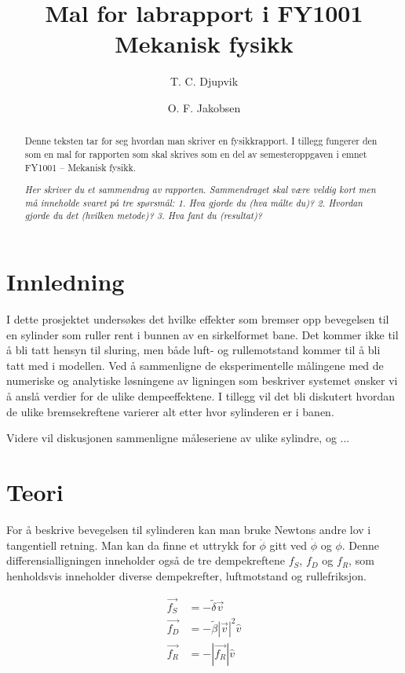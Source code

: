 \documentclass[5p]{elsarticle}
\title{Mal for labrapport i FY1001 Mekanisk fysikk}
\author[fysikk]{T. C. Djupvik}
\author[fysikk]{O. F. Jakobsen}
\begin{document}
\begin{abstract}
Denne teksten tar for seg hvordan man skriver en fysikkrapport. I tillegg fungerer
den som en mal for rapporten som skal skrives som en del av semesteroppgaven i emnet FY1001 – Mekanisk fysikk.

\textit{Her skriver du et sammendrag av rapporten. Sammendraget skal være veldig kort
men må inneholde svaret på tre spørsmål: 1. Hva gjorde du (hva målte du)? 2. Hvordan 
gjorde du det (hvilken metode)? 3. Hva fant du (resultat)?}
\end{abstract}

\maketitle %

\section{Innledning}
I dette prosjektet undersøkes det hvilke effekter som bremser opp bevegelsen 
til en sylinder som ruller rent i bunnen av en sirkelformet bane. Det kommer ikke til å 
bli tatt hensyn til sluring, men både luft- og rullemotstand kommer til å bli tatt med i modellen.
Ved å sammenligne de eksperimentelle målingene med de numeriske og analytiske løsningene av 
ligningen som beskriver systemet ønsker vi å anslå verdier for de ulike dempeeffektene. 
I tillegg vil det bli diskutert hvordan de ulike bremsekreftene varierer alt etter hvor sylinderen 
er i banen.
\par
Videre vil diskusjonen sammenligne måleseriene av ulike sylindre, og ...

\section{Teori}

For å beskrive bevegelsen til sylinderen kan man bruke Newtons andre lov i tangentiell retning.
Man kan da finne et uttrykk for \(\ddot{\phi}\) gitt ved \(\dot{\phi}\) og \(\phi\). 
Denne differensialligningen inneholder også de tre dempekreftene \(f_S\), \(f_D\) og \(f_R\), 
som henholdsvis inneholder diverse dempekrefter, luftmotstand og rullefriksjon.

\begin{align}
	\vec{f_S} & = -\tilde{\delta} \vec{v} 			\\
	\vec{f_D} & = -\tilde{\beta}|\vec{v}|^2\hat{v}  \\
	\vec{f_R} & = -|\vec{f_R}|\hat{v}				
\end{align}
\end{document}

